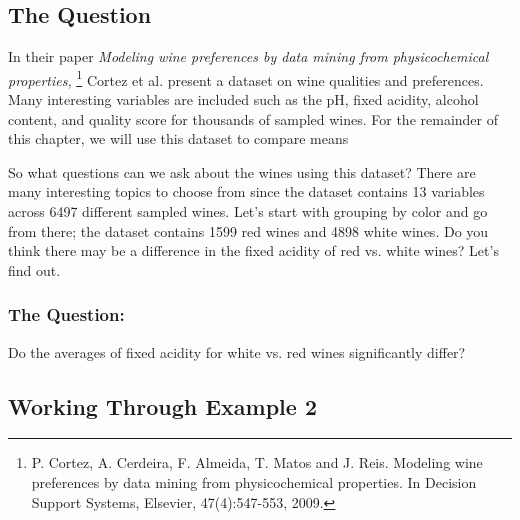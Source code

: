 \documentclass[11pt]{book}\usepackage[]{graphicx}\usepackage[]{color}
\begin{document}
\subsection{The Question}

In their paper \textit{Modeling wine preferences by data mining from physicochemical properties,} \footnote{ P. Cortez, A. Cerdeira, F. Almeida, T. Matos and J. Reis. Modeling wine preferences by data mining from physicochemical properties.  In Decision Support Systems, Elsevier, 47(4):547-553, 2009.}
Cortez et al. present a dataset on wine qualities and preferences. Many interesting variables
are included such as the pH, fixed acidity, alcohol content, and quality score for thousands of 
sampled wines. For the remainder of this chapter, we will use this dataset to compare means 


So what questions can we ask about the wines using this dataset? There are many interesting topics to choose from since the dataset contains 13 variables across 6497 different sampled wines. Let’s start with grouping by color and go from there; the dataset contains 1599 red wines and 4898 white wines. Do you think there may be a difference in the fixed acidity of red vs. white wines? Let’s find out.

\subsubsection{The Question:}  Do the averages of fixed acidity for white vs. red wines significantly differ?

\subsection{Working Through Example 2}
\end{document}
